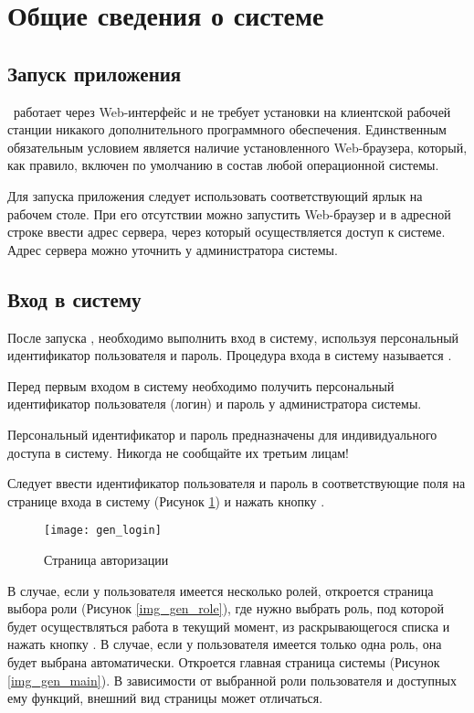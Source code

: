 \newpage
\section{Общие сведения о системе}
\subsection{Запуск приложения}

\tmis~работает через Web-интерфейс и не требует установки на клиентской рабочей станции никакого дополнительного программного обеспечения. Единственным обязательным условием является наличие установленного Web-браузера, который, как правило, включен по умолчанию в состав любой операционной системы.

Для запуска приложения следует использовать соответствующий ярлык на рабочем столе. При его отсутствии можно запустить Web-браузер и в адресной строке ввести адрес сервера, через который осуществляется доступ к системе. Адрес сервера можно уточнить у администратора системы. 

\subsection{Вход в систему}

После запуска \tmis , необходимо выполнить вход в систему, используя персональный идентификатор пользователя и пароль. Процедура входа в систему называется . \label{auth}

Перед первым входом в систему необходимо получить персональный идентификатор пользователя (логин) и пароль у администратора системы.

\begin{vnim}
 Персональный идентификатор и пароль предназначены для индивидуального доступа в систему. Никогда не сообщайте их третьим лицам!
\end{vnim}
 
Следует ввести идентификатор пользователя и пароль в соответствующие поля на странице входа в систему (Рисунок \ref{img_gen_login}) и нажать кнопку . 

\begin{figure}[!ht]\centering
 \texttt{[image: gen\_login]}
 \caption{Страница авторизации}
 \label{img_gen_login}
\end{figure} 

В случае, если у пользователя имеется несколько ролей, откроется страница выбора роли (Рисунок \ref{img_gen_role}), где  нужно выбрать роль, под которой будет осуществляться работа в текущий момент, из раскрывающегося списка  и нажать кнопку . В случае, если у пользователя имеется только одна роль, она будет выбрана автоматически. Откроется главная страница системы (Рисунок \ref{img_gen_main}). В зависимости от выбранной роли пользователя и доступных ему функций, внешний вид страницы может отличаться.  

